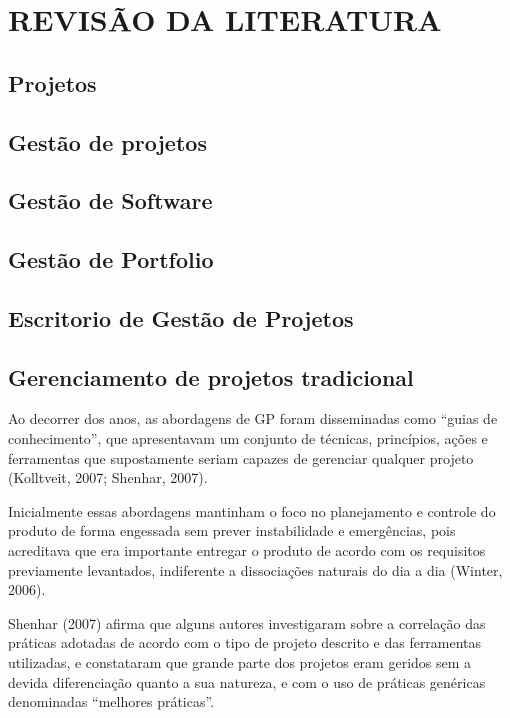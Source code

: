 \chapter{REVISÃO DA LITERATURA}
\thispagestyle{empty}

\section{Projetos}

\section{Gestão de projetos}

\section{Gestão de Software}

\section{Gestão de Portfolio}

\section{Escritorio de Gestão de Projetos}


\section{Gerenciamento de projetos tradicional}

Ao decorrer dos anos, as abordagens de GP foram disseminadas como “guias de conhecimento”, que apresentavam um conjunto de técnicas, princípios, ações e ferramentas que supostamente seriam capazes de gerenciar qualquer projeto (Kolltveit, 2007; Shenhar, 2007).

Inicialmente essas abordagens mantinham o foco no planejamento e controle do produto de forma engessada sem prever instabilidade e emergências, pois acreditava que era importante entregar o produto de acordo com os requisitos previamente levantados, indiferente a dissociações naturais do dia a dia (Winter, 2006).

Shenhar (2007) afirma que alguns autores investigaram sobre a correlação das práticas adotadas de acordo com o tipo de projeto descrito e das ferramentas utilizadas, e constataram que grande parte dos projetos eram geridos sem a devida diferenciação quanto a sua natureza, e com o uso de práticas genéricas denominadas “melhores práticas”.

